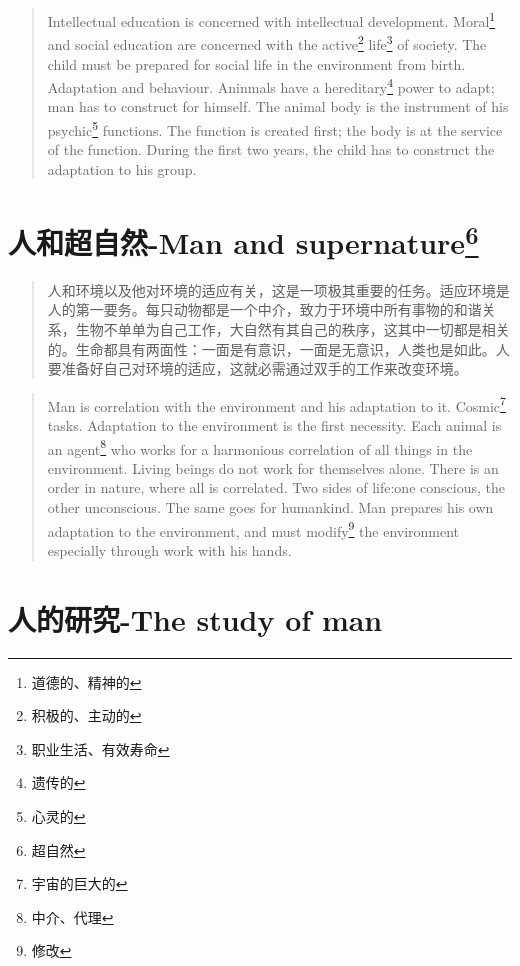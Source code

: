 \documentclass[lang=cn,10pt]{elegantbook}
\begin{document}
\begin{tcolorbox}
\begin{quote}
{\small Intellectual education is concerned with intellectual development. Moral\footnote{道德的、精神的} and social education are concerned with the active\footnote{积极的、主动的} life\footnote{职业生活、有效寿命} of society. The child must be prepared for social life in the environment from birth. Adaptation and behaviour. Aninmals have a hereditary\footnote{遗传的} power to adapt; man has to construct for himself. The animal body is the instrument of his psychic\footnote{心灵的} functions. The function is created first; the body is at the service of the function. During the first two years, the child has to construct the adaptation to his group.}
\end{quote}
\end{tcolorbox}

\chapter{人和超自然-Man and supernature\footnote{超自然}}

\begin{quote}
{\small 人和环境以及他对环境的适应有关，这是一项极其重要的任务。适应环境是人的第一要务。每只动物都是一个中介，致力于环境中所有事物的和谐关系，生物不单单为自己工作，大自然有其自己的秩序，这其中一切都是相关的。生命都具有两面性：一面是有意识，一面是无意识，人类也是如此。人要准备好自己对环境的适应，这就必需通过双手的工作来改变环境。}
\end{quote}

\begin{tcolorbox}
\begin{quote}
{\small Man is correlation with the environment and his adaptation to it. Cosmic\footnote{宇宙的巨大的} tasks. Adaptation to the environment is the first necessity. Each animal is an agent\footnote{中介、代理} who works for a harmonious correlation of all things in the environment. Living beings do not work for themselves alone. There is an order in nature, where all is correlated. Two sides of life:one conscious, the other unconscious. The same goes for humankind. Man prepares his own adaptation to the environment, and must modify\footnote{修改} the environment especially through work with his hands.}
\end{quote}
\end{tcolorbox}

\chapter{人的研究-The study of man}
\end{document}
